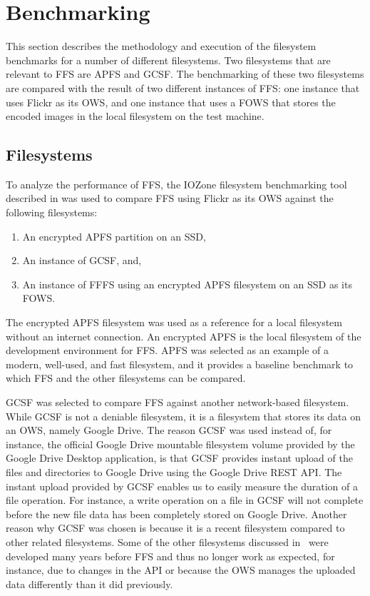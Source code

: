 \section{Benchmarking}
\label{sec:benchmarking}
This section describes the methodology and execution of the filesystem benchmarks for a number of different filesystems. Two filesystems that are relevant to \gls{FFS} are \first \gls{APFS} and \Second \gls{GCSF}. The benchmarking of these two filesystems are compared with the result of two different instances of \gls{FFS}: \first one instance that uses Flickr as its \gls{OWS}, and \Second one instance that uses a \gls{FOWS} that stores the encoded images in the local filesystem on the test machine. 

\subsection{Filesystems}
To analyze the performance of \gls{FFS}, the IOZone filesystem benchmarking tool described in  was used to compare \gls{FFS} using Flickr as its \gls{OWS} against the following filesystems:
\begin{enumerate}
	\item An encrypted \gls{APFS} partition on an SSD,
	\item An instance of \gls{GCSF}, and,
	\item An instance of \gls{FFFS} using an encrypted \gls{APFS} filesystem on an SSD as its \gls{FOWS}.
\end{enumerate}
The encrypted \gls{APFS} filesystem was used as a reference for a local filesystem without an internet connection. An encrypted \gls{APFS} is the local filesystem of the development environment for \gls{FFS}. \gls{APFS} was selected as an example of a modern, \mbox{well-used}, and fast filesystem, and it provides a baseline benchmark to which \gls{FFS} and the other filesystems can be compared.

\gls{GCSF} was selected to compare \gls{FFS} against another \mbox{network-based} filesystem. While \gls{GCSF} is not a deniable filesystem, it is a filesystem that stores its data on an \gls{OWS}, namely Google Drive. The reason \gls{GCSF} was used instead of, for instance, the official Google Drive mountable filesystem volume provided by the Google Drive Desktop application, is that \gls{GCSF} provides instant upload of the files and directories to Google Drive using the Google Drive REST \gls{API}. The instant upload provided by \gls{GCSF} enables us to easily measure the duration of a file operation. For instance, a write operation on a file in \gls{GCSF} will not complete before the new file data has been completely stored on Google Drive. Another reason why \gls{GCSF} was chosen is because it is a recent filesystem compared to other related filesystems. Some of the other filesystems discussed in~ were developed many years before \gls{FFS} and thus no longer work as expected, for instance, due to changes in the \gls{API} or because the \gls{OWS} manages the uploaded data differently than it did previously.

